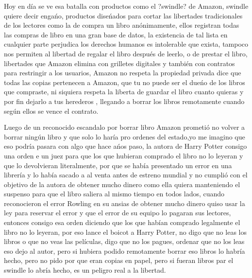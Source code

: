 \begin{multicols}{2}
Hoy en día se ve esa batalla con productos como el  ?swindle? de Amazon, swindle quiere decir engańo, productos diseńados para cortar las libertades tradicionales de los lectores como la de compra un libro anónimamente, ellos registran todas las compras de libro en una gran base de datos, la existencia de tal lista en cualquier parte perjudica los derechos humanos es intolerable que exista, tampoco nos permiten al libertad de regalar el libro después de leerlo, o de prestar el libro, libertades que Amazon elimina con grilletes digitales y también con contratos para restringir a los usuarios, Amazon no respeta la propiedad privada dice que todas las copias pertenecen a Amazon, que tu no puede ser el dueńo de los libros que compraste, ni siquiera respeta la liberta de guardar el libro cuanto quieras y por fin dejarlo a tus herederos , llegando a borrar los libros remotamente cuando según ellos se vence el contrato.

          
Luego de un reconocido escandalo por borrar libro Amazon prometió no volver a borrar ningún libro y que solo lo haría pro ordenes del estado,yo me imagino que eso podría pasara con algo que hace ańos paso, la autora de Harry Potter consigo una orden e un juez para que los que hubieran comprado el libro no lo leyeran y que lo devolvieran literalmente, por que se había presentado un error en una librería y lo había sacado a al venta antes de estreno mundial y no cumplió con el objetivo de la autora de obtener mucho dinero como ella quiera manteniendo el suspenso para que el libro saliera al mismo tiempo en todos lados, cuando reconocieron  el error Rowling en su ansias de obtener mucho dinero quiso usar la ley  para reservar el error y que el error de su equipo lo pagaran sus lectores, entonces consigo esa orden diciendo que los que habían comprado legalmente el libro no lo leyeran, por eso lance el boicot a Harry Potter, no digo que no leas los libros o que no veas las películas, digo que no los pagues, ordenar que no los leas eso dejo al autor, pero si hubiera podido remotamente borrar eso libros lo habría hecho, pero no pido por que eran copias en papel, pero si fueran libros par el swindle lo abría hecho, es un peligro real a la libertad.


\end{multicols}
